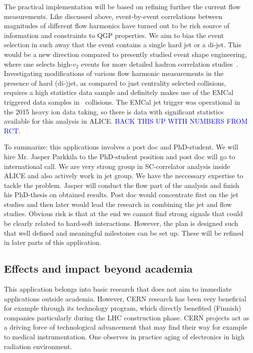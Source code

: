 The practical implementation will be based on refining further the current flow measurements. Like discussed above, event-by-event correlations between magnitudes of different flow harmonics have turned out to be rich source of information and constraints to QGP properties. We aim to bias the event selection in such away that the event contains a single hard jet or a di-jet. This would be a new direction compared to presently studied event shape engineering, where one selects high-$v_2$  events for more detailed hadron correlation studies~\cite{ALICE:2016kpq}. Investigating modifications of various flow harmonic measurements in the presence of hard (di-)jet, as compared to just centrality selected collisions, requires a high statistics data sample and definitely makes use of the EMCal triggered data samples in \pbpb\ collisions. The EMCal jet trigger was operational in the 2015 heavy ion data taking, so there is data with significant statistics available for this analysis in ALICE. \textcolor{blue}{BACK THIS UP WITH NUMBERS FROM RCT.}

To summarize: this applications involves a post doc and PhD-student. We will hire Mr. Jasper Parkkila to the PhD-student position and post doc will go to international call. We are very strong group in SC-correlator analysis inside ALICE and also actively work in jet group. We have the neccessary expertise to tackle the problem. Jasper will conduct the flow part of the analysis and finish his PhD-thesis on obtained results. Post doc would concentrate first on the jet studies and then later would lead the research in combining the jet and flow studies. Obvious risk is that at the end we cannot find strong signals that could be clearly related to hard-soft interactions. However, the plan is designed such that well defined and meaningful milestones can be set up. These will be refined in later parts of this application.

\subsection{Effects and impact beyond academia}

This application belongs into basic research that does not aim to immediate applications outside academia. However, CERN research has been very beneficial for example through its technology program, which directly benefited (Finnish) companies particularly during the LHC construction phase. CERN projects act as a driving force of technological advancement that may find their way for example to medical instrumentation. One observes in practice aging of electronics in high radiation environment.

